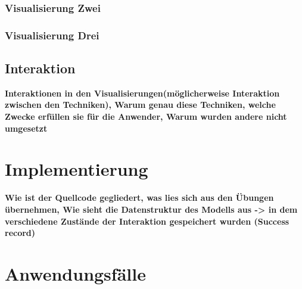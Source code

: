 \documentclass[usegeometry=true]{scrartcl}
\begin{document}
\subsubsection{Visualisierung Zwei}
\subsubsection{Visualisierung Drei}

\subsection{Interaktion}

\textbf{Interaktionen in den Visualisierungen(möglicherweise Interaktion zwischen den Techniken), Warum genau diese Techniken, welche Zwecke erfüllen sie für die Anwender, Warum wurden andere nicht umgesetzt}

\section{Implementierung}


\textbf{Wie ist der Quellcode gegliedert, was lies sich aus den Übungen übernehmen, Wie sieht die Datenstruktur des Modells aus -> in dem verschiedene Zustände der Interaktion gespeichert wurden (Success record)}

\section{Anwendungsfälle}
\end{document}

